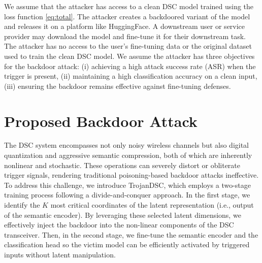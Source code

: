 \documentclass[journal]{IEEEtran}
\begin{document}
We assume that the attacker has access to a clean DSC model trained using the loss function \eqref{eq:total}.  The attacker creates a backdoored variant of the model and releases it on a platform like HuggingFace. A downstream user or service provider may download the model and fine-tune it for their downstream task.
The attacker has no access to the user’s fine-tuning data or the original dataset used to train the clean DSC model.
We assume the attacker has three objectives for the backdoor attack: (i) achieving a high attack success rate (ASR) when the trigger is present, (ii) maintaining a high classification accuracy on a clean input, (iii) ensuring the backdoor remains effective against fine-tuning defenses.  %

\section{Proposed Backdoor Attack}

The DSC system encompasses not only noisy wireless channels but also digital quantization and aggressive semantic compression,  both of which are inherently nonlinear and stochastic. These operations can severely distort or obliterate trigger signals, rendering traditional poisoning-based backdoor attacks ineffective. To address this challenge, we introduce TrojanDSC, 
which employs a two-stage training process following a divide-and-conquer approach.  
In the first stage, we identify the $K$ most critical coordinates of the latent representation 
(i.e., output of the semantic encoder). 
By leveraging these selected latent dimensions, we effectively inject the backdoor into the non-linear components of the DSC transceiver.
Then, in the second stage, we fine-tune the semantic encoder and the classification head so the victim model can be efficiently activated by triggered inputs
without latent manipulation.
\end{document}
